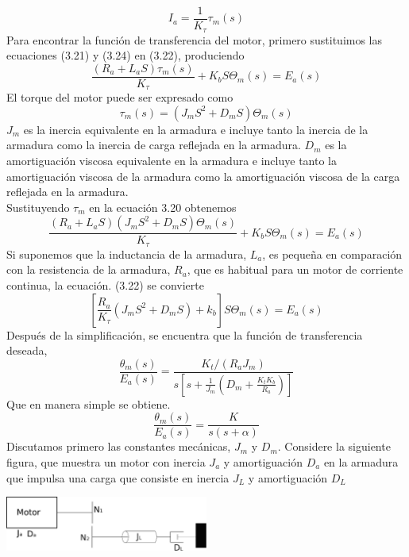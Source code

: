 \begin{equation}
	I_a = \frac{1}{K_\tau} \tau_m (s)
\end{equation}
Para encontrar la función de transferencia del motor, primero sustituimos las ecuaciones (3.21) y (3.24) en (3.22), produciendo
\begin{equation}
	\frac{(R_a + L_aS) \tau_m(s)}{K_\tau} + K_bS \Theta_m(s) = E_a(s)
\end{equation}
El torque del motor puede ser expresado como
\begin{equation}
	\tau_m(s) = (J_mS^2 + D_mS) \Theta_m(s)
\end{equation}
$J_m$ es la inercia equivalente en la armadura e incluye tanto la inercia de la armadura como la inercia de carga reflejada en la armadura. $D_m$ es la amortiguación viscosa
equivalente en la armadura e incluye tanto la amortiguación viscosa de la armadura como la amortiguación viscosa de la carga reflejada en la armadura.\\
Sustituyendo $\tau_m$ en la ecuación 3.20 obtenemos
\begin{equation}
	\frac{(R_a + L_aS) (J_mS^2 + D_mS) \Theta_m(s) }{K_\tau} + K_bS \Theta_m(s) = E_a(s)
\end{equation}
Si suponemos que la inductancia de la armadura, $L_a$, es pequeña en comparación con la resistencia de la armadura, $R_a$, que es habitual para un motor de corriente continua,
la ecuación. (3.22) se convierte
\begin{equation}
	\left[ \frac{R_a }{K_\tau} (J_mS^2 + D_mS) + k_b \right] S\Theta_m(s)  = E_a(s)
\end{equation}
Después de la simplificación, se encuentra que la función de transferencia deseada,
\begin{equation}
	\frac{\theta_m (s)}{E_a(s)} = \frac{K_t / (R_aJ_m)}{s \left[ s + \frac{1}{J_m} \left( D_m + \frac{K_tK_b}{R_a} \right) \right]}
\end{equation}
Que en manera simple se obtiene.
\begin{equation}
	\frac{\theta_m (s)}{E_a(s)} = \frac{K}{s(s+\alpha)}
\end{equation}
Discutamos primero las constantes mecánicas, $J_m$ y $D_m$. Considere la siguiente figura, que muestra un motor con inercia $J_a$
y amortiguación $D_a$ en la armadura que impulsa una carga que consiste en inercia $J_L$ y amortiguación $D_L$
\begin{center}
	\includegraphics[width=0.5\textwidth]{Contenido/Cuerpo/Capitulo3/Fig18.eps}
	\label{fig:ModeloMat:Fig1}
\end{center}
